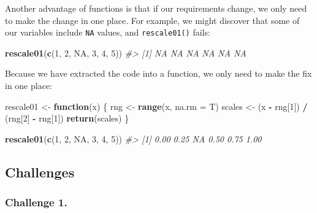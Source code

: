 \documentclass[
]{book}
\newenvironment{Shaded}{\begin{snugshade}}{\end{snugshade}}
\newcommand{\CommentTok}[1]{\textcolor[rgb]{0.56,0.35,0.01}{\textit{#1}}}
\newcommand{\ControlFlowTok}[1]{\textcolor[rgb]{0.13,0.29,0.53}{\textbf{#1}}}
\newcommand{\DataTypeTok}[1]{\textcolor[rgb]{0.13,0.29,0.53}{#1}}
\newcommand{\DecValTok}[1]{\textcolor[rgb]{0.00,0.00,0.81}{#1}}
\newcommand{\KeywordTok}[1]{\textcolor[rgb]{0.13,0.29,0.53}{\textbf{#1}}}
\newcommand{\NormalTok}[1]{#1}
\newcommand{\OperatorTok}[1]{\textcolor[rgb]{0.81,0.36,0.00}{\textbf{#1}}}
\newcommand{\OtherTok}[1]{\textcolor[rgb]{0.56,0.35,0.01}{#1}}
\newcommand{\StringTok}[1]{\textcolor[rgb]{0.31,0.60,0.02}{#1}}
\begin{document}
Another advantage of functions is that if our requirements change, we only need to make the change in one place. For example, we might discover that some of our variables include \texttt{NA} values, and \texttt{rescale01()} fails:

\begin{Shaded}
\begin{Highlighting}[]
\KeywordTok{rescale01}\NormalTok{(}\KeywordTok{c}\NormalTok{(}\DecValTok{1}\NormalTok{, }\DecValTok{2}\NormalTok{, }\OtherTok{NA}\NormalTok{, }\DecValTok{3}\NormalTok{, }\DecValTok{4}\NormalTok{, }\DecValTok{5}\NormalTok{))}
\CommentTok{#> [1] NA NA NA NA NA NA}
\end{Highlighting}
\end{Shaded}

Because we have extracted the code into a function, we only need to make the fix in one place:

\begin{Shaded}
\begin{Highlighting}[]
\NormalTok{rescale01 <-}\StringTok{ }\ControlFlowTok{function}\NormalTok{(x) \{}
\NormalTok{  rng <-}\StringTok{ }\KeywordTok{range}\NormalTok{(x, }\DataTypeTok{na.rm =}\NormalTok{ T)}
\NormalTok{  scales <-}\StringTok{ }\NormalTok{(x }\OperatorTok{-}\StringTok{ }\NormalTok{rng[}\DecValTok{1}\NormalTok{]) }\OperatorTok{/}\StringTok{ }\NormalTok{(rng[}\DecValTok{2}\NormalTok{] }\OperatorTok{-}\StringTok{ }\NormalTok{rng[}\DecValTok{1}\NormalTok{])}
  \KeywordTok{return}\NormalTok{(scales)}
\NormalTok{\}}

\KeywordTok{rescale01}\NormalTok{(}\KeywordTok{c}\NormalTok{(}\DecValTok{1}\NormalTok{, }\DecValTok{2}\NormalTok{, }\OtherTok{NA}\NormalTok{, }\DecValTok{3}\NormalTok{, }\DecValTok{4}\NormalTok{, }\DecValTok{5}\NormalTok{))}
\CommentTok{#> [1] 0.00 0.25   NA 0.50 0.75 1.00}
\end{Highlighting}
\end{Shaded}

\hypertarget{challenges-17}{%
\subsection{Challenges}\label{challenges-17}}

\hypertarget{challenge-1.-14}{%
\subsubsection*{Challenge 1.}\label{challenge-1.-14}}
\end{document}
